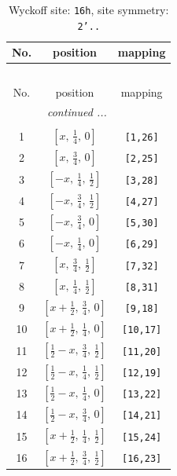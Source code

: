 \documentclass[fleqn,8pt]{jsarticle}
\begin{document}
\renewcommand{\arraystretch}{1.2}
\begin{longtable}{ccc}
\caption{Wyckoff site: {\tt 16h}, site symmetry: {\tt 2'..}}
 \\
 \hline \hline
No. & position & mapping \\ \hline \endfirsthead

\multicolumn{2}{l}{\tablename\ \thetable{}} \\
 \hline \hline
No. & position & mapping \\ \hline \endhead

 \hline \hline
\multicolumn{2}{r}{\footnotesize\it continued ...} \\ \endfoot

 \hline \hline
\multicolumn{2}{r}{} \\ \endlastfoot

1 & $\left[ x,\, \frac{1}{4},\, 0 \right]$ & {\tt [1,26]} \\ \hline
2 & $\left[ x,\, \frac{3}{4},\, 0 \right]$ & {\tt [2,25]} \\ \hline
3 & $\left[ - x,\, \frac{1}{4},\, \frac{1}{2} \right]$ & {\tt [3,28]} \\ \hline
4 & $\left[ - x,\, \frac{3}{4},\, \frac{1}{2} \right]$ & {\tt [4,27]} \\ \hline
5 & $\left[ - x,\, \frac{3}{4},\, 0 \right]$ & {\tt [5,30]} \\ \hline
6 & $\left[ - x,\, \frac{1}{4},\, 0 \right]$ & {\tt [6,29]} \\ \hline
7 & $\left[ x,\, \frac{3}{4},\, \frac{1}{2} \right]$ & {\tt [7,32]} \\ \hline
8 & $\left[ x,\, \frac{1}{4},\, \frac{1}{2} \right]$ & {\tt [8,31]} \\ \hline
9 & $\left[ x + \frac{1}{2},\, \frac{3}{4},\, 0 \right]$ & {\tt [9,18]} \\ \hline
10 & $\left[ x + \frac{1}{2},\, \frac{1}{4},\, 0 \right]$ & {\tt [10,17]} \\ \hline
11 & $\left[ \frac{1}{2} - x,\, \frac{3}{4},\, \frac{1}{2} \right]$ & {\tt [11,20]} \\ \hline
12 & $\left[ \frac{1}{2} - x,\, \frac{1}{4},\, \frac{1}{2} \right]$ & {\tt [12,19]} \\ \hline
13 & $\left[ \frac{1}{2} - x,\, \frac{1}{4},\, 0 \right]$ & {\tt [13,22]} \\ \hline
14 & $\left[ \frac{1}{2} - x,\, \frac{3}{4},\, 0 \right]$ & {\tt [14,21]} \\ \hline
15 & $\left[ x + \frac{1}{2},\, \frac{1}{4},\, \frac{1}{2} \right]$ & {\tt [15,24]} \\ \hline
16 & $\left[ x + \frac{1}{2},\, \frac{3}{4},\, \frac{1}{2} \right]$ & {\tt [16,23]} \\
\end{longtable}
\end{document}
